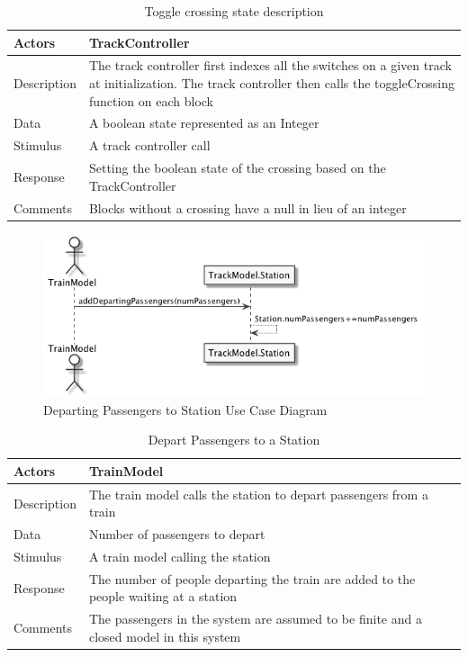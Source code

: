 \documentclass[]{article}
\begin{document}
\begin{table}[H]
	\centering
	\caption{Toggle crossing state description}
	\begin{tabular}{|l|l|}
		\hline
		Actors & \parbox[t]{10cm}{TrackController} \\ \hline
		Description & \parbox[t]{10cm}{The track controller first indexes all the switches on a given track at initialization. The track controller then calls the toggleCrossing function on each block } \\ \hline
		Data &  \parbox[t]{10cm}{A boolean state represented as an Integer} \\ \hline
		Stimulus &  \parbox[t]{10cm}{A track controller call} \\ \hline
		Response & \parbox[t]{10cm}{Setting the boolean state of the crossing based on the TrackController}\\ \hline
		Comments & \parbox[t]{10cm}{Blocks without a crossing have a null in lieu of an integer}  \\ \hline
	\end{tabular}
\end{table}

\begin{figure}[H]
	\centering
	\includegraphics[scale=.5]{departPassengers.png}
	\caption{Departing Passengers to Station Use Case Diagram}
\end{figure}
\begin{table}[H]
	\centering
	\caption{Depart Passengers to a Station}
	\begin{tabular}{|l|l|}
		\hline
		Actors & \parbox[t]{10cm}{TrainModel} \\ \hline
		Description & \parbox[t]{10cm}{The train model calls the station to depart passengers from a train} \\ \hline
		Data &  \parbox[t]{10cm}{Number of passengers to depart} \\ \hline
		Stimulus &  \parbox[t]{10cm}{A train model calling the station} \\ \hline
		Response & \parbox[t]{10cm}{The number of people departing the train are added to the people waiting at a station}\\ \hline
		Comments & \parbox[t]{10cm}{The passengers in the system are assumed to be finite and a closed model in this system}  \\ \hline
	\end{tabular}
\end{table}
\end{document}
